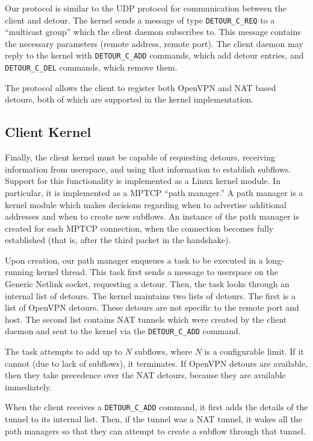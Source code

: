 Our protocol is similar to the UDP protocol for communication between the client
and detour. The kernel sends a message of type \texttt{DETOUR\_C\_REQ} to a
``multicast group'' which the client daemon subscribes to. This message contains
the necessary parameters (remote address, remote port). The client daemon may
reply to the kernel with \texttt{DETOUR\_C\_ADD} commands, which add detour
entries, and \texttt{DETOUR\_C\_DEL} commands, which remove them.

The protocol allows the client to register both OpenVPN and NAT based detours,
both of which are supported in the kernel implementation.

\subsection{Client Kernel}

Finally, the client kernel must be capable of requesting detours, receiving
information from userspace, and using that information to establish subflows.
Support for this functionality is implemented as a Linux kernel module. In
particular, it is implemented as a MPTCP ``path manager.'' A path manager is a
kernel module which makes decisions regarding when to advertise additional
addresses and when to create new subflows. An instance of the path manager is
created for each MPTCP connection, when the connection becomes fully established
(that is, after the third packet in the handshake).

Upon creation, our path manager enqueues a task to be executed in a long-running
kernel thread. This task first sends a message to userspace on the Generic
Netlink socket, requesting a detour. Then, the task looks through an internal
list of detours. The kernel maintains two lists of detours. The first is a list
of OpenVPN detours. These detours are not specific to the remote port and host.
The second list contains NAT tunnels which were created by the client daemon and
sent to the kernel via the \texttt{DETOUR\_C\_ADD} command.

The task attempts to add up to $N$ subflows, where $N$ is a configurable limit.
If it cannot (due to lack of subflows), it terminates. If OpenVPN detours are
available, then they take precedence over the NAT detours, because they are
available immediately.

When the client receives a \texttt{DETOUR\_C\_ADD} command, it first adds the
details of the tunnel to its internal list. Then, if the tunnel was a NAT
tunnel, it wakes all the path managers so that they can attempt to create a
subflow through that tunnel.
